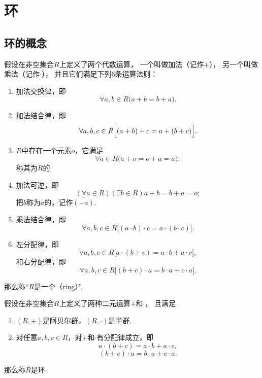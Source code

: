 \section{环}
\subsection{环的概念}
\begin{definition}
假设在非空集合\(R\)上定义了两个代数运算，
一个叫做加法（记作\(+\)），
另一个叫做乘法（记作\(\cdot\)），
并且它们满足下列6条运算法则：
\begin{enumerate}
    \item 加法交换律，即\[
        \forall a,b \in R \bigl(a+b = b+a\bigr).
    \]

    \item 加法结合律，即\[
        \forall a,b,c \in R \Bigl[(a+b)+c = a+(b+c)\Bigr].
    \]

    \item \(R\)中存在一个元素\(o\)，它满足\[
        \forall a \in R \bigl( a+o = o+a = a \bigr);
    \]
    称其为\(R\)的.

    \item 加法可逆，即\[
        (\forall a \in R)(\exists b \in R)
        a+b = b+a = o;
    \]
    把\(b\)称为\(a\)的，记作\((-a)\).

    \item 乘法结合律，即\[
        \forall a,b,c \in R
        \bigl[ (a \cdot b) \cdot c = a \cdot (b \cdot c) \bigr].
    \]

    \item 左分配律，即\[
        \forall a,b,c \in R \bigl[ a \cdot (b+c) = a \cdot b + a \cdot c \bigr],
    \]
    和右分配律，即\[
        \forall a,b,c \in R \bigl[ (b+c) \cdot a = b \cdot a + c \cdot a \bigr].
    \]
\end{enumerate}
那么称“\(R\)是一个（ring）”.
\end{definition}

\begin{theorem}
假设在非空集合\(R\)上定义了两种二元运算\(+\)和\(\cdot\)，
且满足\begin{enumerate}
    \item \((R,+)\)是阿贝尔群，\((R,\cdot)\)是半群.

    \item 对任意\(a,b,c \in R\)，对\(+\)和\(\cdot\)有分配律成立，即\[
        a \cdot (b + c) = a \cdot b + a \cdot c,
    \]\[
        (b + c) \cdot a = b \cdot a + c \cdot a.
    \]
\end{enumerate}
那么称\(R\)是环.
\end{theorem}

